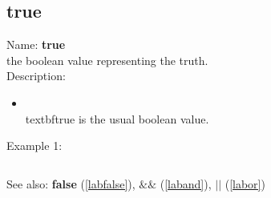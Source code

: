 \subsection{true}
\label{labtrue}
\noindent Name: \textbf{true}\\
the boolean value representing the truth.\\
\noindent Description: \begin{itemize}

\item \\textbf{true} is the usual boolean value.\n\end{itemize}
\noindent Example 1: 
\begin{center}\begin{minipage}{15cm}\begin{Verbatim}[frame=single]
\end{Verbatim}
\end{minipage}\end{center}
See also: \textbf{false} (\ref{labfalse}), \textbf{$\&\&$} (\ref{laband}), \textbf{$||$} (\ref{labor})
